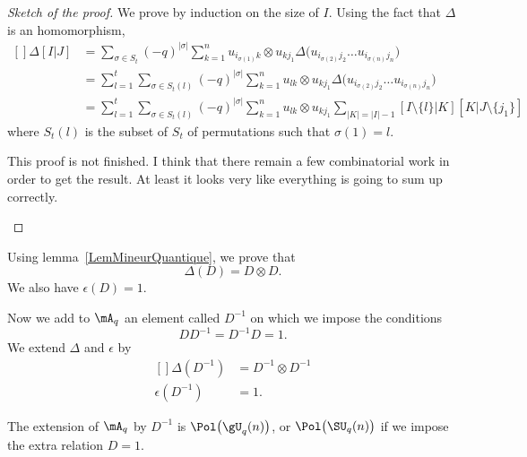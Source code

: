 \begin{proof}[Sketch of the proof]

	We prove by induction on the size of $I$. Using the fact that $\Delta$ is an homomorphism,
	\begin{equation}
		\begin{aligned}[]
			\Delta[I|J] & =\sum_{\sigma\in S_t}(-q)^{| \sigma |}\sum_{k=1}^nu_{i_{\sigma(1)}k}\otimes u_{kj_1}\Delta\big( u_{i_{\sigma(2)}j_2}\ldots u_{i_{\sigma(n)}j_n} \big)    \\
			            & =\sum_{l=1}^t\sum_{\sigma\in S_t(l)}(-q)^{| \sigma |}\sum_{k=1}^nu_{lk}\otimes u_{kj_1}\Delta\big( u_{i_{\sigma(2)}j_2}\ldots u_{i_{\sigma(n)}j_n} \big) \\
			            & =\sum_{l=1}^t\sum_{\sigma\in S_t(l)}(-q)^{| \sigma |}\sum_{k=1}^nu_{lk}\otimes u_{kj_1}\sum_{| K |=| I |-1}[I\setminus\{ l \}|K][K|J\setminus\{ j_1 \}]
		\end{aligned}
	\end{equation}
	where $S_t(l)$ is the subset of $S_t$ of permutations such that $\sigma(1)=l$.

	\begin{probleme}
		This proof is not finished. I think that there remain a few combinatorial work in order to get the result. At least it looks very like everything is going to sum up correctly.
	\end{probleme}
\end{proof}

Using lemma~\ref{LemMineurQuantique}, we prove that
\begin{equation}
	\Delta(D)=D\otimes D.
\end{equation}
We also have $\epsilon(D)=1$.

Now we add to $\mA_q$ an element called $D^{-1}$ on which we impose the conditions
\begin{equation}
	DD^{-1}=D^{-1}D=1.
\end{equation}
We extend $\Delta$ and $\epsilon$ by
\begin{equation}
	\begin{aligned}[]
		\Delta(D^{-1})   & =D^{-1}\otimes D^{-1} \\
		\epsilon(D^{-1}) & =1.
	\end{aligned}
\end{equation}

The extension of $\mA_q$ by $D^{-1}$ is $\Pol\big( \gU_q(n) \big)$, or $\Pol\big( \SU_q(n) \big)$ if we impose the extra relation $D=1$.

